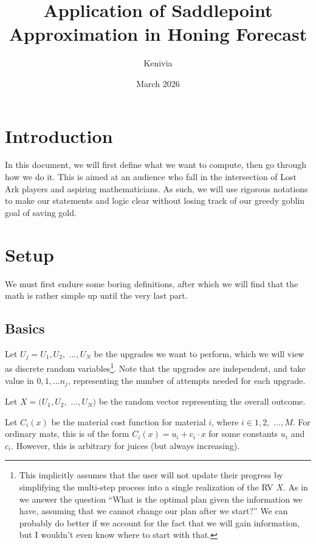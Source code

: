 \documentclass[a4paper,11pt]{article}
\begin{document}


\title{Application of Saddlepoint Approximation in Honing Forecast}
\date{March 2026}
\author{Kenivia}

\maketitle
\tableofcontents
\newpage

\section{Introduction}

In this document, we will first define what we want to compute, then go through how we do it. This is aimed at an audience who fall in the intersection of Lost Ark players and aspiring mathematicians. As such, we will use rigorous notations to make our statements and logic clear without losing track of our greedy goblin goal of saving gold. 

\newpage
\section{Setup}

We must first endure some boring definitions, after which we will find that the math is rather simple up until the very last part.

\subsection{Basics}
Let $U_j = U_1, U_2,$ $\ldots , U_N$ be the upgrades we want to perform, which we will view as discrete random variables\footnote{This implicitly assumes that the user will not update their progress by simplifying the multi-step process into a single realization of the RV $X$. As in we answer the question ``What is the optimal plan given the information we have, assuming that we cannot change our plan after we start?'' We can probably do better if we account for the fact that we will gain information, but I wouldn't even know where to start with that. 
}. Note that the upgrades are independent, and take value in $0, 1, \ldots n_j$, representing the number of attempts needed for each upgrade.

\noindent
Let $X = (U_1, U_2,$ $\ldots , U_N)$ be the random vector representing the overall outcome.

\noindent
Let $C_i(x)$ be the material cost function for material $i$, where $i \in 1,2,$ $\ldots, M$. For ordinary mats, this is of the form $C_i(x) = u_i + c_i \cdot x$ for some constants $u_i$ and $c_i$. However, this is arbitrary for juices (but always increasing).
\end{document}
